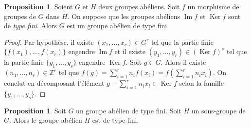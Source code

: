 \documentclass{article}
\newcommand{\Z}{\mathbb{Z}}
\newcommand{\im}{\mathop{\mathrm{Im}}\nolimits}
\renewcommand{\ker}{\mathop{\mathrm{Ker}}\nolimits}
\newcommand{\dis}{\displaystyle}
\theoremstyle{definition}
\newtheorem{prop}[defi]{Proposition}
\theoremstyle{remark}
\begin{document}
\begin{prop}\label{g-type-fini-par-morphisme}
Soient $G$ et $H$ deux groupes abéliens. Soit $f$ un morphisme de groupes de $G$ dans $H$. On suppose que les groupes abéliens $\im f$ et $\ker f$ sont de \textit{type fini}. Alors $G$ est un groupe abélien de type fini.
\end{prop}

\begin{proof}
Par hypothèse, il existe $(x_1, \ldots, x_r) \in G^r$ tel que la partie finie $\{f(x_1), \ldots, f(x_r) \}$ engendre $\im f$ et il existe $(y_1, \ldots, y_r) \in (\ker f)^s$ tel que la partie finie $\{y_1, \ldots, y_s \}$ engendre $\ker f$. Soit $g \in G$. Alors il existe $(n_1, \ldots, n_r) \in \Z^r$ tel que $f(g)=\dis \sum_{i=1}^r n_if(x_i)=f\left(\sum_{i=1}^r n_ix_i\right)$. On conclut en décomposant l'élément $g-\dis \sum_{i=1}^r n_ix_i\in \ker f$ selon la famille $\{y_1, \ldots, y_s\}$.
\end{proof}

\begin{prop}
Soit $G$ un groupe abélien de type fini. Soit $H$ un sous-groupe de $G$. Alors le groupe abélien $H$ est de type fini.
\end{prop}
\end{document}
